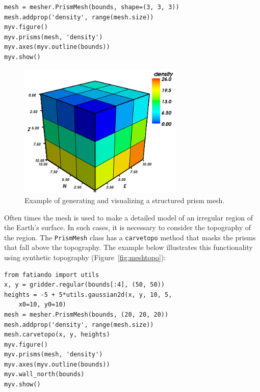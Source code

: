 \begin{verbatim}
mesh = mesher.PrismMesh(bounds, shape=(3, 3, 3))
mesh.addprop('density', range(mesh.size))
myv.figure()
myv.prisms(mesh, 'density')
myv.axes(myv.outline(bounds))
myv.show()
\end{verbatim}

\begin{figure}
    \centering
    \includegraphics[width=0.7\textwidth]{figures/paper1/meshes_3dplotting_mesh}
    \caption{
        Example of generating and visualizing a structured prism mesh.
    }
    \label{fig:mesh}
\end{figure}

Often times the mesh is used to make a detailed model of an irregular
region of the Earth's surface. In such cases, it is necessary to
consider the topography of the region. The \texttt{PrismMesh} class has
a \texttt{carvetopo} method that masks the prisms that fall above the
topography. The example below illustrates this functionality using
synthetic topography (Figure~\ref{fig:meshtopo}):

\begin{verbatim}
from fatiando import utils
x, y = gridder.regular(bounds[:4], (50, 50))
heights = -5 + 5*utils.gaussian2d(x, y, 10, 5,
    x0=10, y0=10)
mesh = mesher.PrismMesh(bounds, (20, 20, 20))
mesh.addprop('density', range(mesh.size))
mesh.carvetopo(x, y, heights)
myv.figure()
myv.prisms(mesh, 'density')
myv.axes(myv.outline(bounds))
myv.wall_north(bounds)
myv.show()
\end{verbatim}

